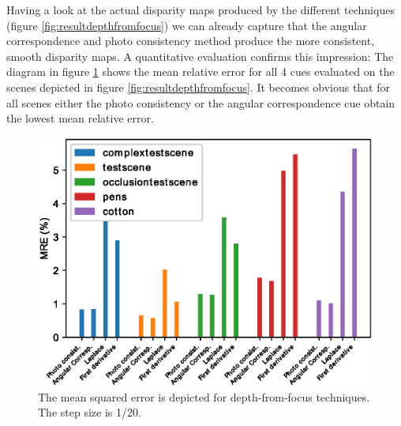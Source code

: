 \documentclass  [
  paper    = a4,
  BCOR     = 10mm,
  twoside,
  fontsize = 12pt,
  fleqn,
  toc      = bibnumbered,
  toc      = listofnumbered,
  numbers  = noendperiod,
  headings = normal,
  listof   = leveldown,
  version  = 3.03
]                                       {scrreprt}
\begin{document}
	Having a look at the actual disparity maps produced by the different techniques (figure \ref{fig:resultdepthfromfocus}) we can already capture that the angular correspondence and photo consistency method produce the more consistent, smooth disparity maps. 
	A quantitative evaluation confirms this impression:
	The diagram in figure \ref{fig:errorres20all} shows the mean relative error for all 4 cues evaluated on the scenes depicted in figure \ref{fig:resultdepthfromfocus}. It becomes obvious that for all scenes either the photo consistency or the angular correspondence cue obtain the lowest mean relative error.	
	\begin{figure}[h!]
		\centering
		\includegraphics[width=0.7\linewidth]{images/error_res20_all}
		\caption[Mean squared error for depth-from-focus techniques]{The mean squared error is depicted for depth-from-focus techniques. The step size is 1/20.}
		\label{fig:errorres20all}
	\end{figure}
\end{document}
